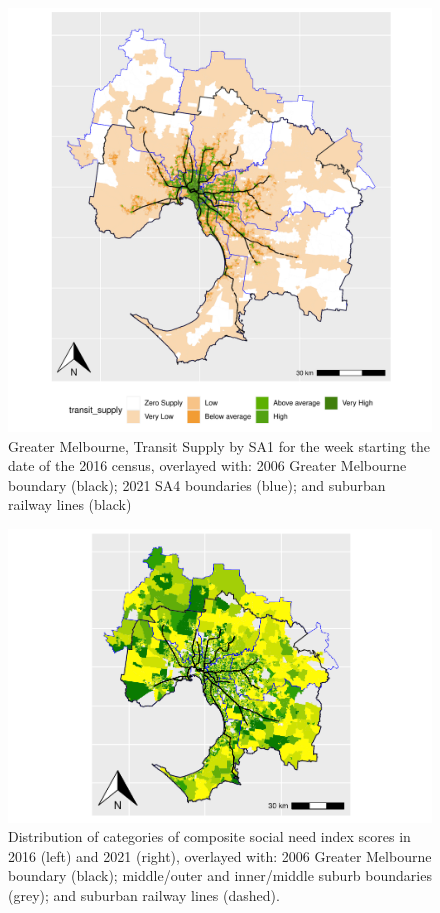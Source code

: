 \documentclass[preprint, 3p,
authoryear]{elsarticle} %
\begin{document}
\begin{figure}
\centering
\includegraphics{ReynoldsCurrieQu2024_files/figure-latex/Greater_Melbourne_SA12016_plot_appendix-1.pdf}
\caption{Greater Melbourne, Transit Supply by SA1 for the week starting
the date of the 2016 census, overlayed with: 2006 Greater Melbourne
boundary (black); 2021 SA4 boundaries (blue); and suburban railway lines
(black)}
\end{figure}

\begin{figure}
\includegraphics[width=0.9\linewidth]{ReynoldsCurrieQu2024_files/figure-latex/Greater_Melbourne_2016_social_needs_appendix-1} \caption{Distribution of categories of composite social need index scores in 2016 (left) and 2021 (right), overlayed with: 2006 Greater Melbourne boundary (black); middle/outer and inner/middle suburb boundaries (grey); and suburban railway lines (dashed).}\label{fig:Greater_Melbourne_2016_social_needs_appendix}
\end{figure}
\end{document}
